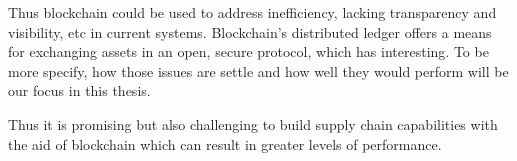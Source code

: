 \begin{comment}
	\item IBM cooperates with Walmart aiming to create a fully transparent food safe system \cite{walmart}.
	\item Oliver Wyman provides an End-To-End Blockchain enabled Supply Chain.
\end{comment} 


Thus blockchain could be used to address inefficiency, lacking transparency and visibility, etc in current systems. Blockchain’s distributed ledger offers a means for exchanging assets in an open, secure protocol, which has interesting. To be more specify, how those issues are settle and how well they would perform will be our focus in this thesis. 

Thus it is promising but also challenging to build supply chain capabilities with the aid of blockchain which can result in greater levels of performance. 



